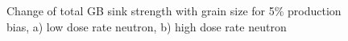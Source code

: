 \documentclass[a4paper]{article}
\begin{document}
      \begin{figure}[h!]  %
        \centering
        \qquad
        \caption{Change of total GB sink strength with grain size for 5\% production bias, a) low dose rate neutron, b) high dose rate neutron}
        \label{figure:sink_strengths_ion_5_1e-3}
      \end{figure}
\end{document}
